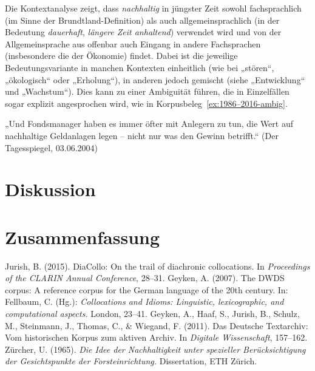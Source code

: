 \documentclass[
    german,
    a4paper,%
    12pt,%
    oneside,%
    toc=bibliography,
    final,
]{scrartcl}
\begin{document}
Die Kontextanalyse zeigt, dass \textit{nachhaltig} in jüngster Zeit sowohl fachsprachlich (im Sinne der Brundtland-Definition) als auch allgemeinsprachlich (in der Bedeutung \textit{dauerhaft}, \textit{längere Zeit anhaltend}) verwendet wird und von der Allgemeinsprache aus offenbar auch Eingang in andere Fachsprachen (insbesondere die der Ökonomie) findet. Dabei ist die jeweilige Bedeutungsvariante in manchen Kontexten einheitlich (wie bei „stören“, „ökologisch“ oder „Erholung“), in anderen jedoch gemischt (siehe „Entwicklung“ und „Wachstum“). Dies kann zu einer Ambiguität führen, die in Einzelfällen sogar explizit angesprochen wird, wie in Korpusbeleg~\ref{ex:1986–2016-ambig}.

\begin{exe}
\ex\label{ex:1986–2016-ambig} „Und Fondsmanager haben es immer öfter mit Anlegern zu tun, die Wert auf nachhaltige Geldanlagen legen – nicht nur was den Gewinn betrifft.“ (Der Tagesspiegel, 03.06.2004)
\end{exe}

\section{Diskussion}
\label{sec:diskussion}


\section{Zusammenfassung}
\label{sec:zusammenfassung}



\newpage
\begin{thebibliography}{9}


 Jurish, B. (2015). DiaCollo: On the trail of diachronic collocations. In \textit{Proceedings of the CLARIN Annual Conference}, 28–31.
 Geyken, A. (2007). The DWDS corpus: A reference corpus for the German language of the 20th century. In: Fellbaum, C. (Hg.): \textit{Collocations and Idioms: Linguistic, lexicographic, and computational aspects.} London, 23–41.
 Geyken, A., Haaf, S., Jurish, B., Schulz, M., Steinmann, J., Thomas, C., \& Wiegand, F. (2011). Das Deutsche Textarchiv: Vom historischen Korpus zum aktiven Archiv. In \textit{Digitale Wissenschaft}, 157–162.
 Zürcher, U. (1965). \textit{Die Idee der Nachhaltigkeit unter spezieller Berücksichtigung der Gesichtspunkte der Forsteinrichtung.} Dissertation, ETH Zürich.

\end{thebibliography}
\end{document}
